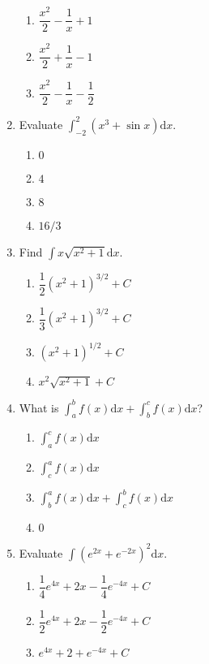 \begin{multicols}{2}
\begin{enumerate}[label={\arabic*.}]
\begin{enumerate}[label={\Alph*.}]
        \item \(\dfrac{x^2}{2} - \dfrac{1}{x} + 1\)
        \item \(\dfrac{x^2}{2} + \dfrac{1}{x} - 1\)
        \item \(\dfrac{x^2}{2} - \dfrac{1}{x} - \dfrac{1}{2}\)
      \end{enumerate}
    \item Evaluate \(\displaystyle \int_{-2}^{2} (x^3 + \sin x) \mathrm{d}x\).
      \begin{enumerate}[label={\Alph*.}]
        \item \(0\)
        \item \(4\)
        \item \(8\)
        \item \(16/3\)
      \end{enumerate}
    \item Find \(\displaystyle \int x \sqrt{x^2+1} \mathrm{d}x\).
      \begin{enumerate}[label={\Alph*.}]
        \item \(\dfrac{1}{2}(x^2+1)^{3/2} + C\)
        \item \(\dfrac{1}{3}(x^2+1)^{3/2} + C\)
        \item \((x^2+1)^{1/2} + C\)
        \item \(x^2\sqrt{x^2+1} + C\)
      \end{enumerate}
    \item What is \(\displaystyle \int_{a}^{b} f(x) \mathrm{d}x + \int_{b}^{c} f(x) \mathrm{d}x\)?
      \begin{enumerate}[label={\Alph*.}]
        \item \(\displaystyle \int_{a}^{c} f(x) \mathrm{d}x\)
        \item \(\displaystyle \int_{c}^{a} f(x) \mathrm{d}x\)
        \item \(\displaystyle \int_{b}^{a} f(x) \mathrm{d}x + \int_{c}^{b} f(x) \mathrm{d}x\)
        \item \(0\)
      \end{enumerate}
    \item Evaluate \(\displaystyle \int {(e^{2x} + e^{-2x})}^2 \mathrm{d}x\).
      \begin{enumerate}[label={\Alph*.}]
        \item \(\dfrac{1}{4}e^{4x} + 2x - \dfrac{1}{4}e^{-4x} + C\)
        \item \(\dfrac{1}{2}e^{4x} + 2x - \dfrac{1}{2}e^{-4x} + C\)
        \item \(e^{4x} + 2 + e^{-4x} + C\)

\end{enumerate}
\end{enumerate}
\end{multicols}
